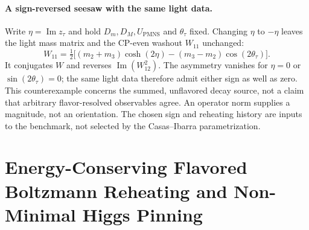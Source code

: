 \documentclass[11pt,a4paper]{article}
\begin{document}
\paragraph{A sign-reversed seesaw with the same light data.}
Write $\eta=\operatorname{Im}z_\tau$ and hold $D_m,D_M,U_{\mathrm{PMNS}}$
and $\theta_\tau$ fixed. Changing $\eta$ to $-\eta$ leaves the light
mass matrix and the CP-even washout $W_{11}$ unchanged:
\[
 W_{11}=\tfrac12\big[(m_2+m_3)\cosh(2\eta)
                     -(m_3-m_2)\cos(2\theta_\tau)\big].
\]
It conjugates $W$ and reverses $\operatorname{Im}(W_{12}^2)$.
The asymmetry vanishes for $\eta=0$ or $\sin(2\theta_\tau)=0$;
the same light data therefore admit either sign as well as zero.
This counterexample concerns the summed, unflavored decay source,
not a claim that arbitrary flavor-resolved observables agree.
An operator norm supplies a magnitude, not an orientation. The
chosen sign and reheating history are inputs to the benchmark,
not selected by the Casas--Ibarra parametrization.

\section{Energy-Conserving Flavored Boltzmann Reheating and Non-Minimal Higgs Pinning}
\label{sec:boltzmann}
\end{document}
